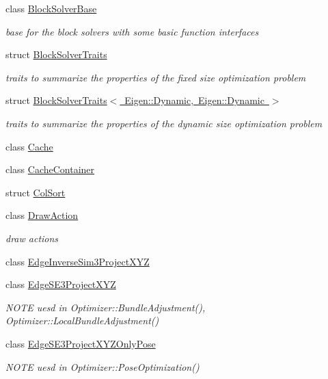\begin{DoxyCompactItemize}
class \mbox{\hyperlink{classg2o_1_1_block_solver_base}{Block\+Solver\+Base}}
\begin{DoxyCompactList}\small\item\em base for the block solvers with some basic function interfaces \end{DoxyCompactList}\item 
struct \mbox{\hyperlink{structg2o_1_1_block_solver_traits}{Block\+Solver\+Traits}}
\begin{DoxyCompactList}\small\item\em traits to summarize the properties of the fixed size optimization problem \end{DoxyCompactList}\item 
struct \mbox{\hyperlink{structg2o_1_1_block_solver_traits_3_01_eigen_1_1_dynamic_00_01_eigen_1_1_dynamic_01_4}{Block\+Solver\+Traits$<$ Eigen\+::\+Dynamic, Eigen\+::\+Dynamic $>$}}
\begin{DoxyCompactList}\small\item\em traits to summarize the properties of the dynamic size optimization problem \end{DoxyCompactList}\item 
class \mbox{\hyperlink{classg2o_1_1_cache}{Cache}}
\item 
class \mbox{\hyperlink{classg2o_1_1_cache_container}{Cache\+Container}}
\item 
struct \mbox{\hyperlink{structg2o_1_1_col_sort}{Col\+Sort}}
\item 
class \mbox{\hyperlink{classg2o_1_1_draw_action}{Draw\+Action}}
\begin{DoxyCompactList}\small\item\em draw actions \end{DoxyCompactList}\item 
class \mbox{\hyperlink{classg2o_1_1_edge_inverse_sim3_project_x_y_z}{Edge\+Inverse\+Sim3\+Project\+X\+YZ}}
\item 
class \mbox{\hyperlink{classg2o_1_1_edge_s_e3_project_x_y_z}{Edge\+S\+E3\+Project\+X\+YZ}}
\begin{DoxyCompactList}\small\item\em N\+O\+TE uesd in Optimizer\+::\+Bundle\+Adjustment(), Optimizer\+::\+Local\+Bundle\+Adjustment() \end{DoxyCompactList}\item 
class \mbox{\hyperlink{classg2o_1_1_edge_s_e3_project_x_y_z_only_pose}{Edge\+S\+E3\+Project\+X\+Y\+Z\+Only\+Pose}}
\begin{DoxyCompactList}\small\item\em N\+O\+TE uesd in Optimizer\+::\+Pose\+Optimization() \end{DoxyCompactList}\item 

\end{DoxyCompactItemize}
